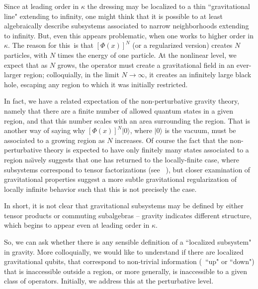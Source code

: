 Since at leading order in $\kappa$ the dressing may be localized to a thin ``gravitational line" extending to infinity\DoGione, one might think that it is possible to at least algebraically describe subsystems associated to narrow neighborhoods extending to infinity.  But, even this appears problematic, when one works to higher order in $\kappa$. The reason for this\SGalg\ is that $[\Phi(x)]^N$ (or a regularized version) creates $N$ particles, with $N$ times the energy of one particle.  At the nonlinear level, we expect that as $N$ grows, the operator must create a gravitational field in an ever-larger region; colloquially, in the limit $N\rightarrow\infty$, it creates an infinitely large black hole, escaping any region to which it was initially restricted.

In fact, we have a related expectation of the non-perturbative gravity theory, namely that there are a finite number of allowed quantum states in a given region, and that this number scales with an area surrounding the region. That is another way of saying why $[\Phi(x)]^N|0\rangle$, where $|0\rangle$ is the vacuum, must be associated to a growing region as $N$ increases.  Of course the fact that the non-perturbative theory is expected to have only finitely many states associated to a region na\"\i vely suggests that one has returned to the locally-finite case, where subsystems correspond to tensor factorizations (see \eg\ ), but closer examination of gravitational properties suggest a more subtle gravitational regularization of locally infinite behavior such that this is not precisely the case.

In short, it is not clear that gravitational subsystems may be defined by either tensor products or commuting subalgebras -- gravity indicates different structure, which begins to appear even at leading order in $\kappa$.

So, we can ask whether there is any sensible definition of a ``localized subsystem" in gravity.  More colloquially, we would like to understand if there are localized gravitational qubits, that correspond to non-trivial information (\eg\ ``up" or ``down") that is inaccessible outside a region, or more generally, is inaccessible to a given class of operators.  Initially, we address this at the perturbative level.

